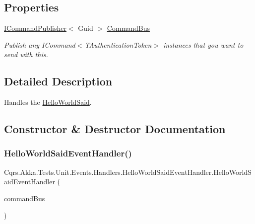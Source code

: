 \subsection*{Properties}
\begin{DoxyCompactItemize}
\item 
\hyperlink{interfaceCqrs_1_1Commands_1_1ICommandPublisher}{I\+Command\+Publisher}$<$ Guid $>$ \hyperlink{classCqrs_1_1Akka_1_1Tests_1_1Unit_1_1Events_1_1Handlers_1_1HelloWorldSaidEventHandler_a67473b7f3dc275d04fe079006da89f6c_a67473b7f3dc275d04fe079006da89f6c}{Command\+Bus}
\begin{DoxyCompactList}\small\item\em Publish any I\+Command$<$\+T\+Authentication\+Token$>$ instances that you want to send with this. \end{DoxyCompactList}\end{DoxyCompactItemize}


\subsection{Detailed Description}
Handles the \hyperlink{classCqrs_1_1Akka_1_1Tests_1_1Unit_1_1Events_1_1HelloWorldSaid}{Hello\+World\+Said}. 



\subsection{Constructor \& Destructor Documentation}
\mbox{\label{classCqrs_1_1Akka_1_1Tests_1_1Unit_1_1Events_1_1Handlers_1_1HelloWorldSaidEventHandler_a8bde891341691d7d73f4cb28f2568335_a8bde891341691d7d73f4cb28f2568335}} 
\subsubsection{\texorpdfstring{Hello\+World\+Said\+Event\+Handler()}{HelloWorldSaidEventHandler()}}
{\footnotesize\ttfamily Cqrs.\+Akka.\+Tests.\+Unit.\+Events.\+Handlers.\+Hello\+World\+Said\+Event\+Handler.\+Hello\+World\+Said\+Event\+Handler (\begin{DoxyParamCaption}\item[{\hyperlink{interfaceCqrs_1_1Akka_1_1Commands_1_1IAkkaCommandPublisher}{I\+Akka\+Command\+Publisher}$<$ Guid $>$}]{command\+Bus }\end{DoxyParamCaption})}




